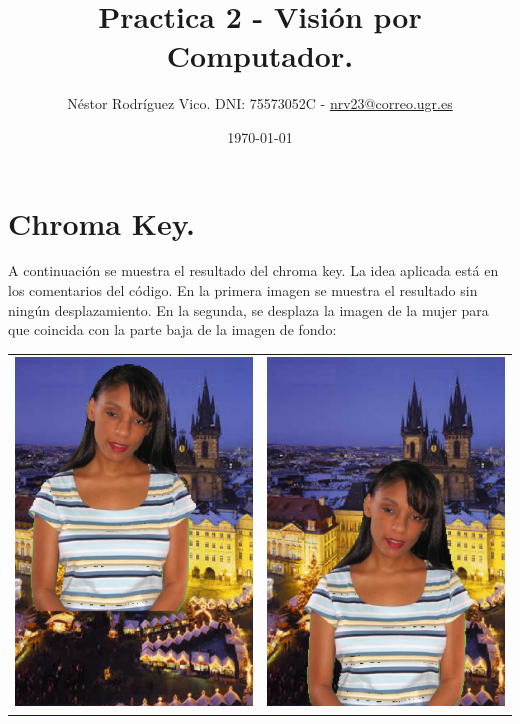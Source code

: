 \documentclass[12pt]{article}
\title{Practica 2 - Visión por Computador.}
\author{Néstor Rodríguez Vico. DNI: 75573052C - \href{mailto:nrv23@correo.ugr.es}{nrv23@correo.ugr.es}}
\date{\today}
\begin{document}
\maketitle

\setlength{\belowdisplayskip}{5pt} 
\setlength{\belowdisplayshortskip}{5pt}
\setlength{\abovedisplayskip}{5pt} 
\setlength{\abovedisplayshortskip}{5pt}

\section{Chroma Key.}

A continuación se muestra el resultado del chroma key. La idea aplicada está en los comentarios del código. En la primera imagen se muestra el resultado sin ningún desplazamiento. En la segunda, se desplaza la imagen de la mujer para que coincida con la parte baja de la imagen de fondo:

\begin{table}[H]
	\centering
	\begin{tabular}{cc}
		\includegraphics[width=0.4\linewidth]{images/1.png} &\includegraphics[width=0.4\linewidth]{images/2.png}
	\end{tabular}
\end{table}
\end{document}
